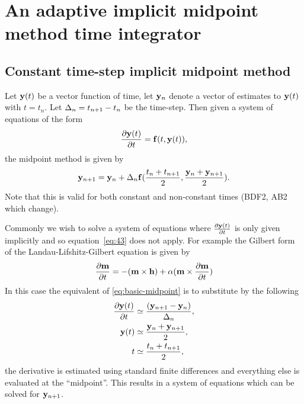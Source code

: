 
\section{An adaptive implicit midpoint method time integrator}







\subsection{Constant time-step implicit midpoint method}

Let $\mathbf{y}(t)$ be a vector function of time, let $\mathbf{y}_n$ denote a vector of estimates to $\mathbf{y}(t)$ with $t = t_n$.
Let $\Delta_{n} = t_{n+1} - t_n$ be the time-step.
Then given a system of equations of the form
\begin{equation}
  \frac{\partial \mathbf{y}(t)}{\partial t} = {\mathbf{f}}(t, \mathbf{y}(t)),
  \label{eq:43}
\end{equation}
the midpoint method is given by
\begin{equation}
  \mathbf{y}_{n+1} = \mathbf{y}_n + \Delta_{n} {\mathbf{f}}(\frac{t_n + t_{n+1}}{2}, \frac{\mathbf{y}_n + \mathbf{y}_{n+1}}{2}).
  \label{eq:basic-midpoint}
\end{equation}
Note that this is valid for both constant and non-constant times (\cf BDF2, AB2 which change).

Commonly we wish to solve a system of equations where $ \frac{\partial \mathbf{y}(t)}{\partial t}$ is only given implicitly and so equation~\eqref{eq:43} does not apply.
For example the Gilbert form of the Landau-Lifshitz-Gilbert equation is given by
\begin{equation}
  \frac{\partial \mathbf{m}}{\partial t} = -(\mathbf{m} \times \mathbf{h}) + \alpha (\mathbf{m} \times \frac{\partial \mathbf{m}}{\partial t})
\end{equation}
 In this case the equivalent of \eqref{eq:basic-midpoint} is to substitute by the following
\begin{align}
  \label{eq:implicit-f-midpoint}
  \frac{\partial \mathbf{y}(t)}{\partial t} & \simeq \frac{(\mathbf{y}_{n+1} - \mathbf{y}_n)}{\Delta_{n}}, \\
  \mathbf{y}(t) & \simeq \frac{\mathbf{y}_n + \mathbf{y}_{n+1}}{2}, \notag \\
  t & \simeq \frac{t_n + t_{n+1}}{2}, \notag
\end{align}
\ie the derivative is estimated using standard finite differences and everything else is evaluated at the ``midpoint''.
This results in a system of equations which can be solved for $\mathbf{y}_{n+1}$.

